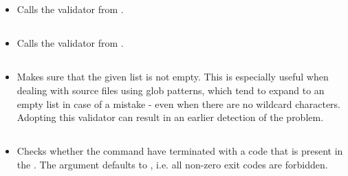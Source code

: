 \subsection*{}\label{subsec:FileExistsPrerequisite}
\begin{itemize}[label={}]
    \item Calls the  validator from
          \hyperref[sec:Validators]{}.
\end{itemize}

\subsection*{}\label{subsec:ProgramExistsPrerequisite}
\begin{itemize}[label={}]
    \item Calls the  validator from
          \hyperref[sec:Validators]{}.
\end{itemize}

\subsection*{}\label{subsec:NonEmptyListPrerequisite}
\begin{itemize}[label={}]
    \item Makes sure that the given list is not empty.
          This is especially useful when dealing with source files using glob patterns, which tend to expand to an empty
          list in case of a mistake - even when there are no wildcard characters.
          Adopting this validator can result in an earlier detection of the problem.
\end{itemize}

\subsection*{}\label{subsec:ExitCodePostcondition}
\begin{itemize}[label={}]
    \item Checks whether the command have terminated with a code that is present in the .
          The argument defaults to \python{[0]}, i.e. all non-zero exit codes are forbidden.
\end{itemize}

